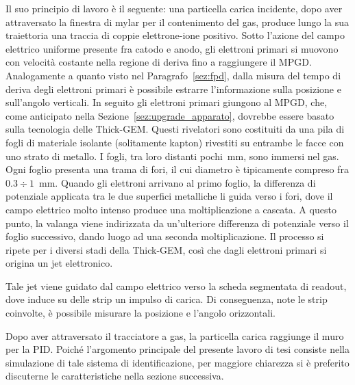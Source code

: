 Il suo principio di lavoro è il seguente: una particella carica incidente, dopo aver attraversato la finestra di mylar per il contenimento del gas, produce lungo la sua traiettoria una traccia di coppie elettrone-ione positivo. 
Sotto l'azione del campo elettrico uniforme presente fra catodo e anodo, gli elettroni primari si muovono con velocità costante nella regione di deriva fino a raggiungere il MPGD.
Analogamente a quanto visto nel Paragrafo~\ref{sez:fpd}, dalla misura del tempo di deriva degli elettroni primari è possibile estrarre l'informazione sulla posizione e sull'angolo verticali.
In seguito gli elettroni primari giungono al MPGD, che, come anticipato nella Sezione~\ref{sez:upgrade_apparato}, dovrebbe essere basato sulla tecnologia delle Thick-GEM.
Questi rivelatori sono costituiti da una pila di fogli di materiale isolante (solitamente kapton) rivestiti su entrambe le facce con uno strato di metallo.
I fogli, tra loro distanti pochi~mm, sono immersi nel gas.
Ogni foglio presenta una trama di fori, il cui diametro è tipicamente compreso fra $ 0.3 \div 1$~mm.
Quando gli elettroni arrivano al primo foglio, la differenza di potenziale applicata tra le due superfici metalliche li guida verso i fori, dove il campo elettrico molto intenso produce una moltiplicazione a cascata.
A questo punto, la valanga viene indirizzata da un'ulteriore differenza di potenziale verso il foglio successivo, dando luogo ad una seconda moltiplicazione.
Il processo si ripete per i diversi stadi della Thick-GEM, così che dagli elettroni primari si origina un jet elettronico. 

Tale jet viene guidato dal campo elettrico verso la scheda segmentata di readout, dove induce su delle strip un impulso di carica. 
Di conseguenza, note le strip coinvolte, è possibile misurare la posizione e l'angolo orizzontali. 





Dopo aver attraversato il tracciatore a gas, la particella carica raggiunge il muro per la PID.
Poiché l'argomento principale del presente lavoro di tesi consiste nella simulazione di tale sistema di identificazione, per maggiore chiarezza si è preferito discuterne le caratteristiche nella sezione successiva.

